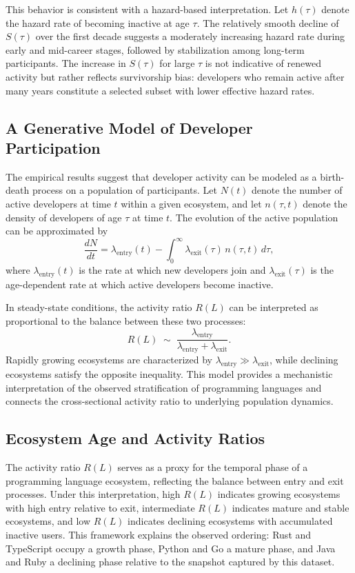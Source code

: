 \documentclass[12pt,a4paper]{article}
\begin{document}
This behavior is consistent with a hazard-based interpretation. Let $h(\tau)$ denote the hazard rate of becoming inactive at age $\tau$. The relatively smooth decline of $S(\tau)$ over the first decade suggests a moderately increasing hazard rate during early and mid-career stages, followed by stabilization among long-term participants. The increase in $S(\tau)$ for large $\tau$ is not indicative of renewed activity but rather reflects survivorship bias: developers who remain active after many years constitute a selected subset with lower effective hazard rates.

\subsection{A Generative Model of Developer Participation}

The empirical results suggest that developer activity can be modeled as a birth-death process on a population of participants. Let $N(t)$ denote the number of active developers at time $t$ within a given ecosystem, and let $n(\tau, t)$ denote the density of developers of age $\tau$ at time $t$. The evolution of the active population can be approximated by
\[
\frac{dN}{dt} = \lambda_{\text{entry}}(t) - \int_0^\infty \lambda_{\text{exit}}(\tau)\, n(\tau, t)\, d\tau,
\]
where $\lambda_{\text{entry}}(t)$ is the rate at which new developers join and $\lambda_{\text{exit}}(\tau)$ is the age-dependent rate at which active developers become inactive.

In steady-state conditions, the activity ratio $R(L)$ can be interpreted as proportional to the balance between these two processes:
\[
R(L) \;\sim\; \frac{\lambda_{\text{entry}}}{\lambda_{\text{entry}} + \lambda_{\text{exit}}}.
\]
Rapidly growing ecosystems are characterized by $\lambda_{\text{entry}} \gg \lambda_{\text{exit}}$, while declining ecosystems satisfy the opposite inequality. This model provides a mechanistic interpretation of the observed stratification of programming languages and connects the cross-sectional activity ratio to underlying population dynamics.

\subsection{Ecosystem Age and Activity Ratios}

The activity ratio $R(L)$ serves as a proxy for the temporal phase of a programming language ecosystem, reflecting the balance between entry and exit processes. Under this interpretation, high $R(L)$ indicates growing ecosystems with high entry relative to exit, intermediate $R(L)$ indicates mature and stable ecosystems, and low $R(L)$ indicates declining ecosystems with accumulated inactive users. This framework explains the observed ordering: Rust and TypeScript occupy a growth phase, Python and Go a mature phase, and Java and Ruby a declining phase relative to the snapshot captured by this dataset.
\end{document}

